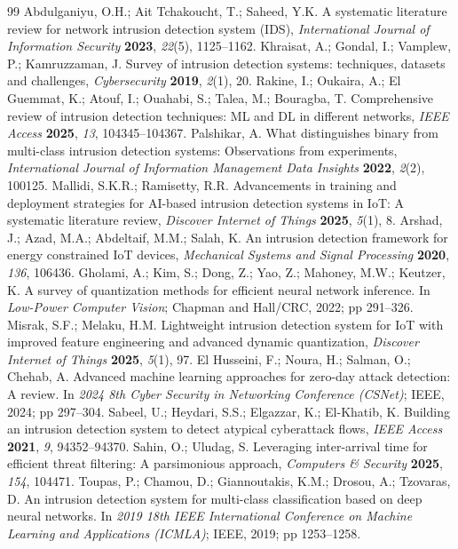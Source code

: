 \documentclass[]{interact}
\theoremstyle{plain}
\theoremstyle{definition}
\begin{document}
\begin{thebibliography}{99}
 Abdulganiyu, O.H.; Ait Tchakoucht, T.; Saheed, Y.K. A systematic literature review for network intrusion detection system (IDS), \emph{International Journal of Information Security} \textbf{2023}, \emph{22}(5), 1125--1162.
 Khraisat, A.; Gondal, I.; Vamplew, P.; Kamruzzaman, J. Survey of intrusion detection systems: techniques, datasets and challenges, \emph{Cybersecurity} \textbf{2019}, \emph{2}(1), 20.
 Rakine, I.; Oukaira, A.; El Guemmat, K.; Atouf, I.; Ouahabi, S.; Talea, M.; Bouragba, T. Comprehensive review of intrusion detection techniques: ML and DL in different networks, \emph{IEEE Access} \textbf{2025}, \emph{13}, 104345--104367.
 Palshikar, A. What distinguishes binary from multi-class intrusion detection systems: Observations from experiments, \emph{International Journal of Information Management Data Insights} \textbf{2022}, \emph{2}(2), 100125.
 Mallidi, S.K.R.; Ramisetty, R.R. Advancements in training and deployment strategies for AI-based intrusion detection systems in IoT: A systematic literature review, \emph{Discover Internet of Things} \textbf{2025}, \emph{5}(1), 8.
 Arshad, J.; Azad, M.A.; Abdeltaif, M.M.; Salah, K. An intrusion detection framework for energy constrained IoT devices, \emph{Mechanical Systems and Signal Processing} \textbf{2020}, \emph{136}, 106436.
 Gholami, A.; Kim, S.; Dong, Z.; Yao, Z.; Mahoney, M.W.; Keutzer, K. A survey of quantization methods for efficient neural network inference. In \emph{Low-Power Computer Vision}; Chapman and Hall/CRC, 2022; pp 291--326.
 Misrak, S.F.; Melaku, H.M. Lightweight intrusion detection system for IoT with improved feature engineering and advanced dynamic quantization, \emph{Discover Internet of Things} \textbf{2025}, \emph{5}(1), 97.
 El Husseini, F.; Noura, H.; Salman, O.; Chehab, A. Advanced machine learning approaches for zero-day attack detection: A review. In \emph{2024 8th Cyber Security in Networking Conference (CSNet)}; IEEE, 2024; pp 297--304.
 Sabeel, U.; Heydari, S.S.; Elgazzar, K.; El-Khatib, K. Building an intrusion detection system to detect atypical cyberattack flows, \emph{IEEE Access} \textbf{2021}, \emph{9}, 94352--94370.
 Sahin, O.; Uludag, S. Leveraging inter-arrival time for efficient threat filtering: A parsimonious approach, \emph{Computers \& Security} \textbf{2025}, \emph{154}, 104471.
 Toupas, P.; Chamou, D.; Giannoutakis, K.M.; Drosou, A.; Tzovaras, D. An intrusion detection system for multi-class classification based on deep neural networks. In \emph{2019 18th IEEE International Conference on Machine Learning and Applications (ICMLA)}; IEEE, 2019; pp 1253--1258.

\end{thebibliography}
\end{document}
